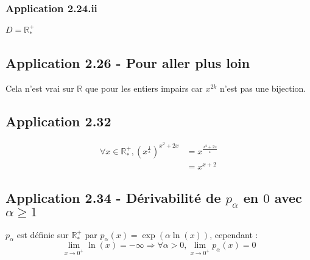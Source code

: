 \documentclass[a4paper,10pt]{report}
\begin{document}

\subsubsection*{Application 2.24.ii}

$D=\mathbb{R}^{+}_*$


\subsection*{Application 2.26 - Pour aller plus loin}
Cela n'est vrai sur $\mathbb{R}$ que pour les entiers impairs car $x^{2k}$ n'est pas une bijection.

\subsection*{Application 2.32}
\begin{equation*}
	\begin{split}
		\forall x \in \mathbb{R}^{+}_{*}, \left(  x^{\frac{1}{x}} \right)^{x^2+2x}
		&= x^{\frac{x^2+2x}{x}} \\
		&= x^{x+2}
	\end{split}
\end{equation*}


\subsection*{Application 2.34 - Dérivabilité de $p_{\alpha}$ en $0$ avec $\alpha \geq 1$}

$p_{\alpha}$ est définie sur $\mathbb{R}^{+}_{*}$ par $p_{\alpha}(x) = \exp(\alpha \ln(x))$, cependant :
\begin{displaymath}
	\lim_{x\rightarrow 0^{+}} \ln(x) = -\infty \Longrightarrow\forall \alpha>0, \lim_{x\rightarrow 0^{+}} p_{\alpha}(x) = 0
\end{displaymath}
\end{document}
